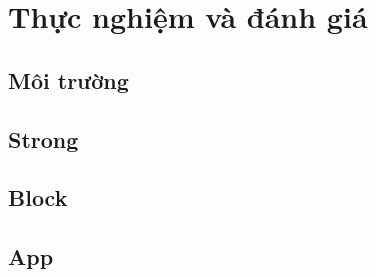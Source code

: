\chapter{Thực nghiệm và đánh giá}
\label{ch:experiments}
\section{Môi trường}\label{sec:exp-env}
\section{Strong}\label{sec:exp-strong}
\section{Block}\label{sec:exp-block}
\section{App}\label{sec:exp-app}
